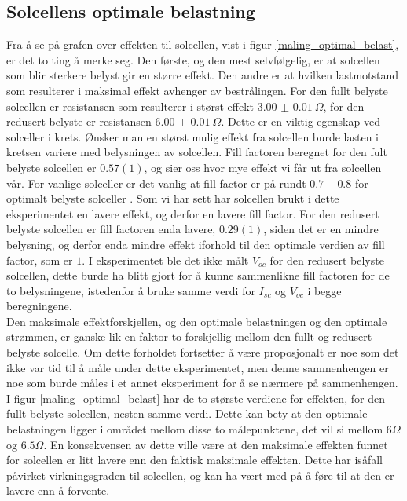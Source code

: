 \documentclass[%
 reprint,
 amsmath,amssymb,
 aps,
 norsk,
 booktabs
]{revtex4-1}
\begin{document}
\subsection{Solcellens optimale belastning}
Fra å se på grafen over effekten til solcellen, vist i figur \vref{maling_optimal_belast}, er det to ting å merke seg. Den første, og den mest selvfølgelig, er at solcellen som blir sterkere belyst gir en større effekt. Den andre er at hvilken lastmotstand som resulterer i maksimal effekt avhenger av bestrålingen. For den fullt belyste solcellen er resistansen som resulterer i størst effekt $\SI{3.00(1)}{\Omega}$, for den redusert belyste er resistansen $\SI{6.00(1)}{\Omega}$. Dette er en viktig egenskap ved solceller i krets. Ønsker man en størst mulig effekt fra solcellen burde lasten i kretsen variere med belysningen av solcellen. Fill factoren beregnet for den fult belyste solcellen er $0.57(1)$, og sier oss hvor mye effekt vi får ut fra solcellen vår. For vanlige solceller er det vanlig at fill factor er på rundt $0.7-0.8$ for optimalt belyste solceller \cite{energy_alt}. Som vi har sett har solcellen brukt i dette eksperimentet en lavere effekt, og derfor en lavere fill factor. For den redusert belyste solcellen er fill factoren enda lavere, $0.29(1)$, siden det er en mindre belysning, og derfor enda mindre effekt iforhold til den optimale verdien av fill factor, som er $1$. I eksperimentet ble det ikke målt $V_{oc}$ for den redusert belyste solcellen, dette burde ha blitt gjort for å kunne sammenlikne fill factoren for de to belysningene, istedenfor å bruke samme verdi for $I_{sc}$ og $V_{oc}$ i begge beregningene.
\\Den maksimale effektforskjellen, og den optimale belastningen og den optimale strømmen, er ganske lik en faktor to forskjellig mellom den fullt og redusert belyste solcelle. Om dette forholdet fortsetter å være proposjonalt er noe som det ikke var tid til å måle under dette eksperimentet, men denne sammenhengen er noe som burde måles i et annet eksperiment for å se nærmere på sammenhengen.\\ I figur \vref{maling_optimal_belast} har de to største verdiene for effekten, for den fullt belyste solcellen, nesten samme verdi. Dette kan bety at den optimale belastningen ligger i området mellom disse to målepunktene, det vil si mellom $6\Omega$ og $6.5\Omega$. En konsekvensen av dette ville være at den maksimale effekten funnet for solcellen er litt lavere enn den faktisk maksimale effekten. Dette har isåfall påvirket virkningsgraden til solcellen, og kan ha vært med på å føre til at den er lavere enn å forvente.
\end{document}
